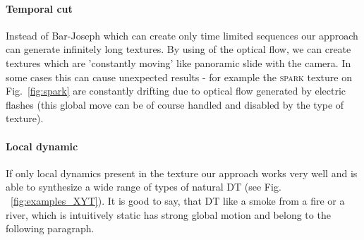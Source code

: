 \paragraph{Temporal cut}
	Instead of Bar-Joseph\cite{Bar-joseph01texturemixing} which can create only time limited sequences our approach can generate infinitely long textures. By using of the optical flow, we can create textures which are 'constantly moving' like panoramic slide with the camera. In some cases this can cause unexpected results - for example the \textsc{spark} texture on Fig.~\ref{fig:spark} are constantly drifting due to optical flow generated by electric flashes (this global move can be of course handled and disabled by the type of texture).
	
	
	
\paragraph{Local dynamic}
	If only local dynamics present in the texture our approach works very well and is able to synthesize a wide range of types of natural DT (see Fig. ~\ref{fig:examples_XYT}).  It is good to say, that DT like a smoke from a fire or a river, which is intuitively static has strong global motion and belong to the following paragraph.
	
